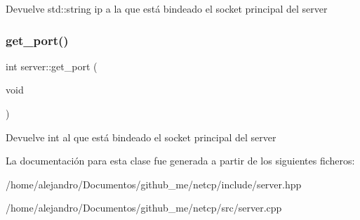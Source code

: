 \begin{DoxyReturn}{Devuelve}
std\+::string ip a la que está bindeado el socket principal del server 
\end{DoxyReturn}
\mbox{\label{classserver_a85c34ce8e949d74f068025b11bd04bcc}} 
\subsubsection{\texorpdfstring{get\+\_\+port()}{get\_port()}}
{\footnotesize\ttfamily int server\+::get\+\_\+port (\begin{DoxyParamCaption}\item[{void}]{ }\end{DoxyParamCaption})}

\begin{DoxyReturn}{Devuelve}
int al que está bindeado el socket principal del server 
\end{DoxyReturn}


La documentación para esta clase fue generada a partir de los siguientes ficheros\+:\begin{DoxyCompactItemize}
\item 
/home/alejandro/\+Documentos/github\+\_\+me/netcp/include/server.\+hpp\item 
/home/alejandro/\+Documentos/github\+\_\+me/netcp/src/server.\+cpp\end{DoxyCompactItemize}
